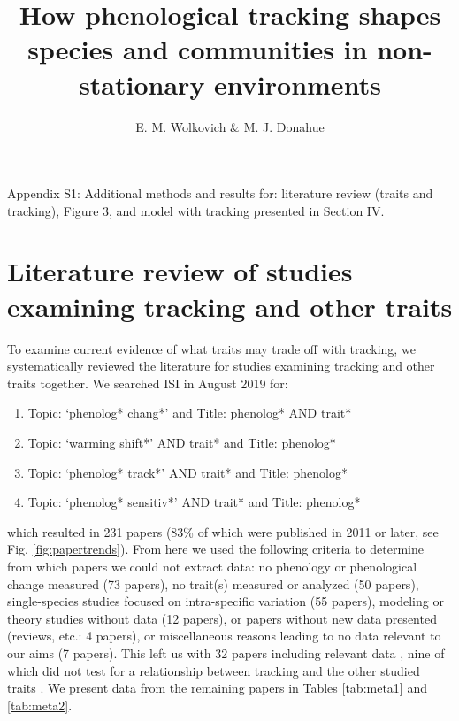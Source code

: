 \documentclass[11pt,letter]{article}
\begin{document}
\renewcommand{\refname}{\CHead{}}

\title{How phenological tracking shapes species and communities in non-stationary environments} 

\author{E. M. Wolkovich \& M. J. Donahue}
\date{} 
\maketitle  %
\renewcommand{\thetable}{S\arabic{table}}
\renewcommand{\thefigure}{S\arabic{figure}}

Appendix S1: Additional methods and results for: literature review (traits and tracking), Figure 3, and model with tracking presented in Section IV.

\section{Literature review of studies examining tracking and other traits}
To examine current evidence of what traits may trade off with tracking, we systematically reviewed the literature for studies examining tracking and other traits together. We searched ISI in August 2019 for:
\begin{enumerate}
\item Topic: `phenolog* chang*' and Title: phenolog* AND trait*
\item Topic: `warming shift*' AND trait* and Title: phenolog*
\item Topic: `phenolog* track*' AND trait* and Title: phenolog*
\item Topic: `phenolog* sensitiv*' AND trait* and Title: phenolog*
\end{enumerate}
which resulted in 231 papers (83\% of which were published in 2011 or later, see Fig. \ref{fig:papertrends}). From here we used the following criteria to determine from which papers we could not extract data: no phenology or phenological change measured (73 papers), no trait(s) measured or analyzed (50 papers), single-species studies focused on intra-specific variation (55 papers), modeling or theory studies without data (12 papers), or papers without new data presented (reviews, etc.: 4 papers), or miscellaneous reasons leading to no data relevant to our aims (7 papers). This left us with 32 papers including relevant data \citep{Suzuki:1997gf,Post1999,adrian2006,Xu:2009an,Goodenough2010,Diamond:2011nx,Moussus2011,Szilvia2012,Dorji2013,Ishioka2013,xia2013,Bock2014,kharouba2014,Vegvari2015,bell2015,jing2016,lasky2016,McDermott2016,Zhu2016BioLetters,brooks2017,du2017,munson2017,arfinkhan2018,zhang2018,Ladwig2019,park2019,sharma2019,Xavier2019,Zettlemoyer2019}, nine of which did not test for a relationship between tracking and the other studied traits \citep{Suzuki:1997gf,adrian2006,Xu:2009an,Szilvia2012,bell2015,McDermott2016,Sherwood2017,sharma2019,Xavier2019}. We present data from the remaining papers in Tables \ref{tab:meta1} and \ref{tab:meta2}. \\
\end{document}
